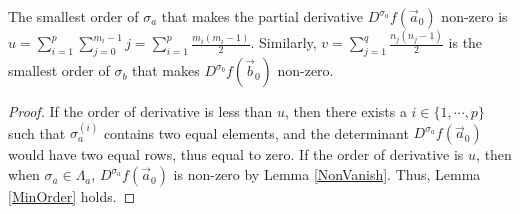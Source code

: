 \begin{lemma}{\label{MinOrder}}
The smallest order of $\sigma_{a}$ that makes the partial derivative $D^{\sigma_{a}}f(\vec{a}_{0})$ non-zero is $u=\sum_{i=1}^{p}\sum_{j=0}^{m_{i}-1}j=\sum_{i=1}^{p}\frac{m_{i}(m_{i}-1)}{2}$. Similarly, $v=\sum_{j=1}^{q}\frac{n_{j}(n_{j}-1)}{2}$ is the smallest order of $\sigma_{b}$ that makes $D^{\sigma_{b}}f(\vec{b}_{0})$ non-zero.
\end{lemma}
\begin{proof}
	If the order of derivative is less than $u$, then there exists a $i\in\{1,\cdots,p\}$ such that $\sigma_{a}^{(i)}$ contains two equal elements, and the determinant $D^{\sigma_{a}}f(\vec{a}_{0})$ would have two equal rows, thus equal to zero. If the order of derivative is $u$, then when $\sigma_{a}\in\Lambda_{a}$, $D^{\sigma_{a}}f(\vec{a}_{0})$ is non-zero by Lemma \ref{NonVanish}. Thus, Lemma \ref{MinOrder} holds.
\end{proof}

